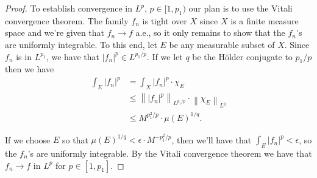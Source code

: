 \documentclass[11pt,letterpaper]{report}
\newcommand{\Lp}[2]{\left\|{#1}\right\|_{L^{#2}}}
\begin{document}
\begin{enumerate}
\begin{proof}
		\noindent To establish convergence in $L^p$, $p\in [1, p_1)$ our plan is to use the Vitali convergence theorem. The family $f_n$ is tight over $X$ since $X$ is a finite measure space and we're given that $f_n\to f$ a.e., so it only remains to show that the $f_n$'s are uniformly integrable.
		To this end, let $E$ be any measurable subset of $X$. Since $f_n$ is in $L^{p_1}$, we have that $|f_n|^p\in L^{p_1/p}$. If we let $q$ be the H\"older conjugate to $p_1/p$ then we have
		\begin{align*}
			\int_E|f_n|^p &= \int_X |f_n|^p \cdot \chi_E\\
			&\leq \Lp{|f_n|^p}{p_1/p}\cdot \Lp{\chi_E}{q}\\
			&\leq M^{p_1^2/p}\cdot \mu(E)^{1/q}.
		\end{align*}

		If we choose $E$ so that $\mu(E)^{1/q} < \epsilon\cdot M^{-p_1^2/p}$, then we'll have that $\int_E|f_n|^p <\epsilon$, so the $f_n$'s are uniformly integrable. By the Vitali convergence theorem we have that $f_n\to f$ in $L^p$ for $p\in [1, p_1]$.
	\end{proof}


\end{enumerate}
\end{document}
